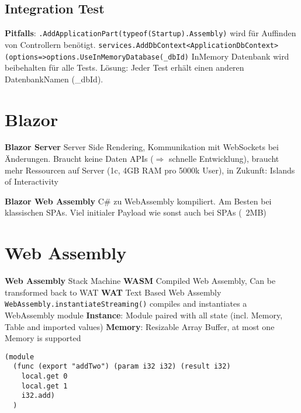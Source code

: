\begin{multicols*}{2}
\subsection{Integration Test}
\textbf{Pitfalls}: \lstinline|.AddApplicationPart(typeof(Startup).Assembly)| wird für Auffinden von Controllern benötigt.
\lstinline|services.AddDbContext<ApplicationDbContext>(options=>options.UseInMemoryDatabase(_dbId)|
InMemory Datenbank wird beibehalten für alle Tests. Lösung: Jeder Test erhält einen anderen DatenbankNamen (\_dbId).

\section{Blazor}
\textbf{Blazor Server} Server Side Rendering, Kommunikation mit WebSockets bei Änderungen. Braucht keine Daten APIs (\(\Rightarrow\) schnelle Entwicklung), braucht mehr Ressourcen auf Server (1c, 4GB RAM pro 5000k User), in Zukunft: Islands of Interactivity

\textbf{Blazor Web Assembly} C\# zu WebAssembly kompiliert. Am Besten bei klassischen SPAs. Viel initialer Payload wie sonst auch bei SPAs (~2MB)

\section{Web Assembly}
\textbf{Web Assembly} Stack Machine
\textbf{WASM} Compiled Web Assembly, Can be transformed back to WAT
\textbf{WAT} Text Based Web Assembly \lstinline|WebAssembly.instantiateStreaming()| compiles and instantiates a WebAssembly module
\textbf{Instance}: Module paired with all state (incl. Memory, Table and imported values)
\textbf{Memory}: Resizable Array Buffer, at most one Memory is supported
\begin{verbatim}
(module
  (func (export "addTwo") (param i32 i32) (result i32)
    local.get 0
    local.get 1
    i32.add)
  )
\end{verbatim}


\end{multicols*}
